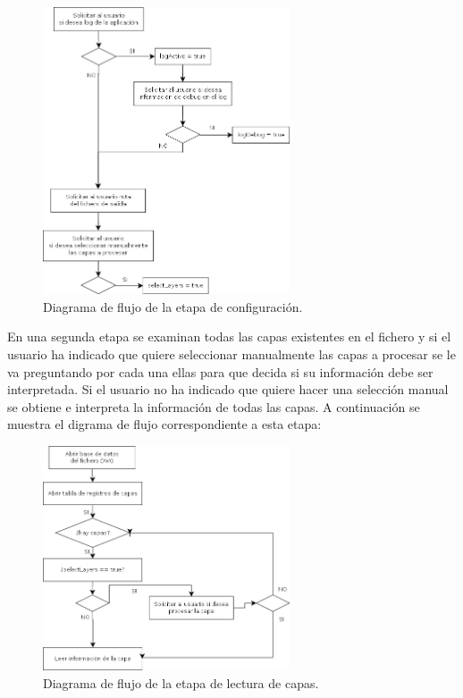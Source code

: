 \begin{itemize}
\begin{figure}[H]
\begin{center}
\includegraphics[width=0.65\textwidth]{imgs/diagramaFlujo}
\caption{Diagrama de flujo de la etapa de configuración.}
\end{center}
\end{figure}

En una segunda etapa se examinan todas las capas existentes en el fichero y si el usuario ha indicado que quiere seleccionar manualmente las capas a procesar se le va preguntando por cada una ellas para que decida si su información debe ser interpretada. Si el usuario no ha indicado que quiere hacer una selección manual se obtiene e interpreta la información de todas las capas. A continuación se muestra el digrama de flujo correspondiente a esta etapa:

\begin{figure}[H]
\begin{center}
\includegraphics[width=0.65\textwidth]{imgs/diagramaFlujo2}
\caption{Diagrama de flujo de la etapa de lectura de capas.}
\end{center}
\end{figure}


\end{itemize}
